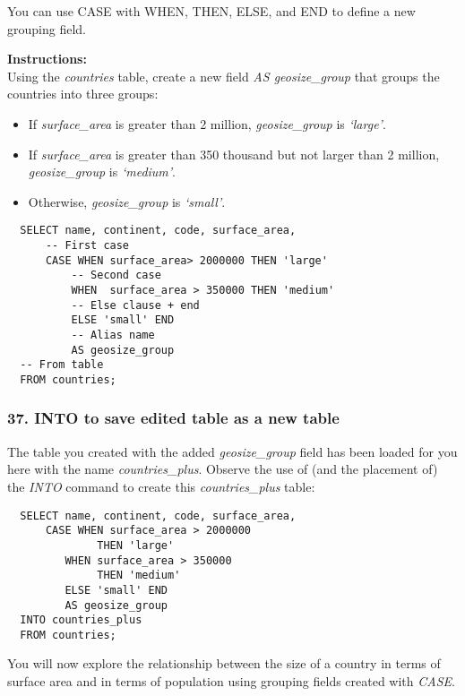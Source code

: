 \documentclass[
]{article}
\providecommand{\tightlist}{%
  \setlength{\itemsep}{0pt}\setlength{\parskip}{0pt}}
\begin{document}
You can use CASE with WHEN, THEN, ELSE, and END to define a new grouping
field.

\textbf{Instructions:}\\
Using the \emph{countries} table, create a new field \emph{AS
geosize\_group} that groups the countries into three groups:

\begin{itemize}
\tightlist
\item
  If \emph{surface\_area} is greater than 2 million,
  \emph{geosize\_group} is \emph{`large'}.
\item
  If \emph{surface\_area} is greater than 350 thousand but not larger
  than 2 million, \emph{geosize\_group} is \emph{`medium'}.
\item
  Otherwise, \emph{geosize\_group} is \emph{`small'}.
\end{itemize}

\begin{verbatim}
  SELECT name, continent, code, surface_area,
      -- First case
      CASE WHEN surface_area> 2000000 THEN 'large'
          -- Second case
          WHEN  surface_area > 350000 THEN 'medium'
          -- Else clause + end
          ELSE 'small' END
          -- Alias name
          AS geosize_group
  -- From table
  FROM countries;
\end{verbatim}

\hypertarget{into-to-save-edited-table-as-a-new-table}{%
\subsubsection{37. INTO to save edited table as a new
table}\label{into-to-save-edited-table-as-a-new-table}}

The table you created with the added \emph{geosize\_group} field has
been loaded for you here with the name \emph{countries\_plus}. Observe
the use of (and the placement of) the \emph{INTO} command to create this
\emph{countries\_plus} table:

\begin{verbatim}
  SELECT name, continent, code, surface_area,
      CASE WHEN surface_area > 2000000
              THEN 'large'
         WHEN surface_area > 350000
              THEN 'medium'
         ELSE 'small' END
         AS geosize_group
  INTO countries_plus
  FROM countries;
\end{verbatim}

You will now explore the relationship between the size of a country in
terms of surface area and in terms of population using grouping fields
created with \emph{CASE}.
\end{document}
